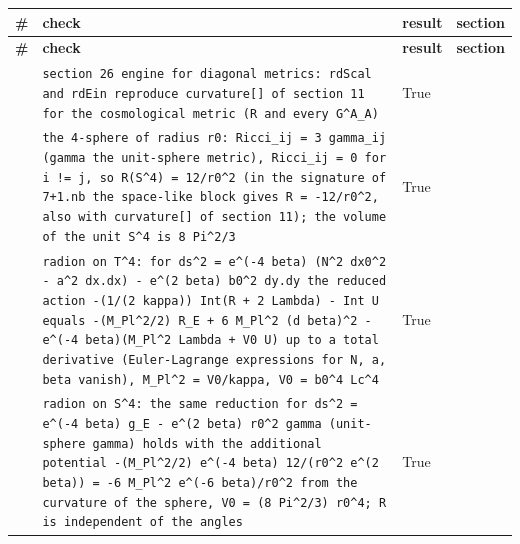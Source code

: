 \documentclass[10pt,a4paper]{article}
\begin{document}
{\footnotesize
\begin{longtable}{>{\raggedright\arraybackslash}p{}>{\raggedright\arraybackslash}p{}>{\raggedright\arraybackslash}p{}>{\raggedright\arraybackslash}p{}}
\toprule
\textbf{\#} & \textbf{check} & \textbf{result} & \textbf{section} \\
\midrule\endfirsthead
\toprule
\textbf{\#} & \textbf{check} & \textbf{result} & \textbf{section} \\
\midrule\endhead
\endfoot
\bottomrule\endlastfoot
1 & \texttt{section 26 engine for diagonal metrics: rdScal and rdEin reproduce curvature[] of section 11 for the cosmological metric (R and every G\textasciicircum{}A\_\allowbreak{}A)} & True & 26.1 \\
2 & \texttt{the 4-sphere of radius r0: Ricci\_\allowbreak{}ij = 3 gamma\_\allowbreak{}ij (gamma the unit-sphere metric), Ricci\_\allowbreak{}ij = 0 for i != j, so R(S\textasciicircum{}4) = 12/\allowbreak{}r0\textasciicircum{}2 (in the signature of 7+1.nb the space-like block gives R = -12/\allowbreak{}r0\textasciicircum{}2, also with curvature[] of section 11); the volume of the unit S\textasciicircum{}4 is 8 Pi\textasciicircum{}2/\allowbreak{}3} & True & 26.1 \\
3 & \texttt{radion on T\textasciicircum{}4: for ds\textasciicircum{}2 = e\textasciicircum{}(-4 beta) (N\textasciicircum{}2 dx0\textasciicircum{}2 - a\textasciicircum{}2 dx.dx) - e\textasciicircum{}(2 beta) b0\textasciicircum{}2 dy.dy the reduced action -(1/\allowbreak{}(2 kappa)) Int(R + 2 Lambda) - Int U equals -(M\_\allowbreak{}Pl\textasciicircum{}2/\allowbreak{}2) R\_\allowbreak{}E + 6 M\_\allowbreak{}Pl\textasciicircum{}2 (d beta)\textasciicircum{}2 - e\textasciicircum{}(-4 beta)(M\_\allowbreak{}Pl\textasciicircum{}2 Lambda + V0 U) up to a total derivative (Euler-Lagrange expressions for N, a, beta vanish), M\_\allowbreak{}Pl\textasciicircum{}2 = V0/\allowbreak{}kappa, V0 = b0\textasciicircum{}4 Lc\textasciicircum{}4} & True & 26.1 \\
4 & \texttt{radion on S\textasciicircum{}4: the same reduction for ds\textasciicircum{}2 = e\textasciicircum{}(-4 beta) g\_\allowbreak{}E - e\textasciicircum{}(2 beta) r0\textasciicircum{}2 gamma (unit-sphere gamma) holds with the additional potential -(M\_\allowbreak{}Pl\textasciicircum{}2/\allowbreak{}2) e\textasciicircum{}(-4 beta) 12/\allowbreak{}(r0\textasciicircum{}2 e\textasciicircum{}(2 beta)) = -6 M\_\allowbreak{}Pl\textasciicircum{}2 e\textasciicircum{}(-6 beta)/\allowbreak{}r0\textasciicircum{}2 from the curvature of the sphere, V0 = (8 Pi\textasciicircum{}2/\allowbreak{}3) r0\textasciicircum{}4; R is independent of the angles} & True & 26.1 \\

\end{longtable}}
\end{document}
